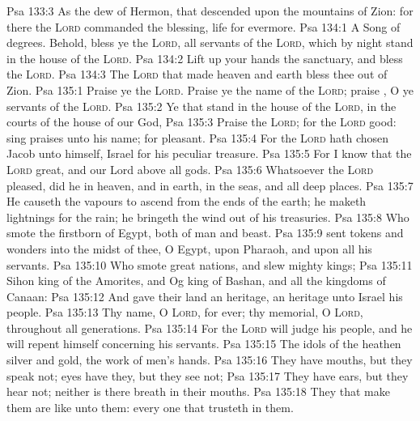 \vs Psa 133:3 As the dew of Hermon,  that descended upon the mountains of Zion: for there the \textsc{Lord} commanded the blessing,  life for evermore.
\vs Psa 134:1 A Song of degrees. Behold, bless ye the \textsc{Lord}, all  servants of the \textsc{Lord}, which by night stand in the house of the \textsc{Lord}.
\vs Psa 134:2 Lift up your hands  the sanctuary, and bless the \textsc{Lord}.
\vs Psa 134:3 The \textsc{Lord} that made heaven and earth bless thee out of Zion.
\vs Psa 135:1 Praise ye the \textsc{Lord}. Praise ye the name of the \textsc{Lord}; praise , O ye servants of the \textsc{Lord}.
\vs Psa 135:2 Ye that stand in the house of the \textsc{Lord}, in the courts of the house of our God,
\vs Psa 135:3 Praise the \textsc{Lord}; for the \textsc{Lord}  good: sing praises unto his name; for  pleasant.
\vs Psa 135:4 For the \textsc{Lord} hath chosen Jacob unto himself,  Israel for his peculiar treasure.
\vs Psa 135:5 For I know that the \textsc{Lord}  great, and  our Lord  above all gods.
\vs Psa 135:6 Whatsoever the \textsc{Lord} pleased,  did he in heaven, and in earth, in the seas, and all deep places.
\vs Psa 135:7 He causeth the vapours to ascend from the ends of the earth; he maketh lightnings for the rain; he bringeth the wind out of his treasuries.
\vs Psa 135:8 Who smote the firstborn of Egypt, both of man and beast.
\vs Psa 135:9  sent tokens and wonders into the midst of thee, O Egypt, upon Pharaoh, and upon all his servants.
\vs Psa 135:10 Who smote great nations, and slew mighty kings;
\vs Psa 135:11 Sihon king of the Amorites, and Og king of Bashan, and all the kingdoms of Canaan:
\vs Psa 135:12 And gave their land  an heritage, an heritage unto Israel his people.
\vs Psa 135:13 Thy name, O \textsc{Lord},  for ever;  thy memorial, O \textsc{Lord}, throughout all generations.
\vs Psa 135:14 For the \textsc{Lord} will judge his people, and he will repent himself concerning his servants.
\vs Psa 135:15 The idols of the heathen  silver and gold, the work of men's hands.
\vs Psa 135:16 They have mouths, but they speak not; eyes have they, but they see not;
\vs Psa 135:17 They have ears, but they hear not; neither is there  breath in their mouths.
\vs Psa 135:18 They that make them are like unto them:  every one that trusteth in them.
